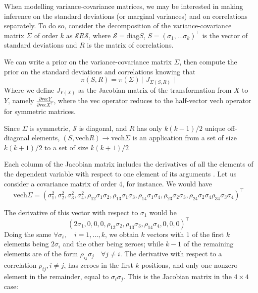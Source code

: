 \documentclass{article}
\begin{document}
When modelling variance-covariance matrices, we may be interested in making inference on the standard deviations (or marginal variances) and on correlations separately. To do so, consider the decomposition of the variance-covariance matrix $\Sigma$ of order $k$ as $\mathcal{S}R\mathcal{S}$, where $\mathcal{S} = \mathrm{diag} S$, $ S = (\sigma_1, \dots \sigma_k)^\top$ is the vector of standard deviations and $R$ is the matrix of correlations.

We can write a prior on the variance-covariance matrix $\Sigma$, then compute the prior on the standard deviations and correlations knowing that 
$$
\pi(S, R) = \pi(\Sigma) \mid J_{\Sigma  (S,R)}\mid
$$
Where we define $J_{Y(X)}$ as the Jacobian matrix of the transformation from $X$ to $Y$, namely $\frac{\partial \mathrm{vec}Y}{\partial \mathrm{vec}X^\top}$, where the $\mathrm{vec}$ operator reduces to the half-vector $\mathrm{vech}$ operator for symmetric matrices. 

Since $\Sigma$ is symmetric, $\mathcal{S}$ is diagonal, and $R$ has only $k(k-1)/2$ unique off-diagonal elements, $(S, \mathrm{vech}R) \rightarrow \mathrm{vech}\Sigma$ is an application from a set of size $k(k+1)/2$ to a set of size $k(k+1)/2$

Each column of the Jacobian matrix includes the derivatives of all the elements of the dependent variable with respect to one element of its arguments \cite{Magnus}.  Let us consider a covariance matrix of order $4$, for instance. We would have 
$$\mathrm{vech} \Sigma = (\sigma_1^2, \sigma_2^2, \sigma_3^2, \sigma_4^2, \rho_{12} \sigma_1 \sigma_2 , \rho_{13} \sigma_1 \sigma_3, \rho_{14} \sigma_1 \sigma_4, \rho_{23} \sigma_2 \sigma_3, \rho_{24} \sigma_2 \sigma_4 \rho_{34} \sigma_3 \sigma_4   )^\top$$

The derivative of this vector with respect to $\sigma_1$ would be 
$$(2 \sigma_1, 0,0,0, \rho_{12} \sigma_2, \rho_{13} \sigma_3, \rho_{14} \sigma_4, 0, 0, 0)^\top$$
Doing the same $ \forall \sigma_i, \quad i = 1, \dots, k$, we obtain $k$ vectors with $1$ of the first $k$ elements being $2 \sigma_i$ and the other being zeroes; while $k-1$ of the remaining elements are of the form $\rho_{ij} \sigma_j \quad \forall j \neq i$. 
The derivative with respect to a correlation $\rho_{ij}, i \neq j$, has zeroes in the first $k$ positions, and only one nonzero element in the remainder, equal to $\sigma_i \sigma_j$. This is the Jacobian matrix in the $4 \times 4$ case:
\end{document}
